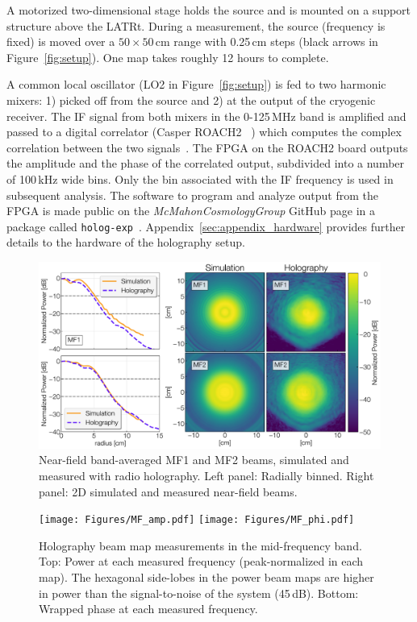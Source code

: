 A motorized two-dimensional  stage holds the source and is mounted on a support structure above the LATRt.  During a measurement, the source (frequency is fixed) is moved over a $50\times50$\,cm range with 0.25\,cm steps (black arrows in Figure~\ref{fig:setup}).   One map takes roughly 12 hours to complete.

A common local oscillator (LO2 in Figure~\ref{fig:setup}) is fed to two harmonic mixers: 1) picked off from the source and 2) at the output of the cryogenic receiver.  The IF signal from both mixers in the 0-125\,MHz band is amplified and passed to a digital correlator (Casper ROACH2 ~\cite{roach2}) which computes the complex correlation between the two signals~\cite{ches18}.  The FPGA on the ROACH2 board outputs the amplitude and the phase of the correlated output, subdivided into a number of 100\,kHz wide bins.  Only the bin associated with the IF frequency is used in subsequent analysis.  The software to program and analyze output from the FPGA is made public on the \textit{McMahonCosmologyGroup} GitHub page in a package called \verb|holog-exp|~\cite{holog-exp}.  Appendix~\ref{sec:appendix_hardware} provides further details to the hardware of the holography setup.

\begin{figure}[hb!]
    \centering
    \includegraphics[width = .9\textwidth]{Figures/nearfields.pdf}
    \caption{Near-field band-averaged MF1 and MF2 beams, simulated and measured with radio holography. Left panel: Radially binned.  Right panel: 2D simulated and measured near-field beams.}
    \label{fig:nearfields}
\end{figure}

\begin{figure}[ht]
    \centering
    \texttt{[image: Figures/MF\_amp.pdf]}
    \texttt{[image: Figures/MF\_phi.pdf]}
    \caption{Holography beam map measurements in the mid-frequency band.  Top: Power at each measured frequency (peak-normalized in each map). The hexagonal side-lobes in the power beam maps are higher in power than the signal-to-noise of the system (45\,dB).  Bottom: Wrapped phase at each measured frequency.}

    \label{fig:beam_measurements_all}
\end{figure}

